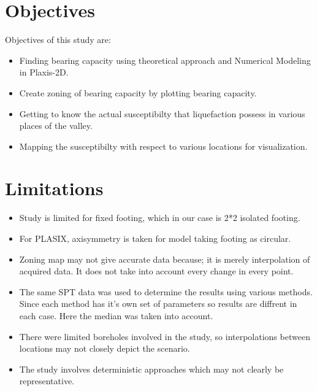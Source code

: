 \section{Objectives}
Objectives of this study are:
\begin{itemize}
  \item	Finding bearing capacity using theoretical approach and Numerical Modeling in Plaxis-2D.
  \item	Create zoning of bearing capacity by plotting bearing capacity.
  \item	Getting to know the actual susceptibilty that liquefaction possess in various places of the valley.
  \item	Mapping the susceptibilty with respect to various locations for visualization.  
\end{itemize}

\section{Limitations}
\begin{itemize}
  \item	Study is limited for fixed footing, which in our case is 2*2 isolated footing.
  \item For PLASIX, axisymmetry is taken for model taking footing as circular.
  \item	Zoning map may not give accurate data because; it is merely interpolation of acquired data. It does not take into account every change in every point.
  \item The same SPT data was used to determine the results using various methods. Since each method has it's own set of parameters so results are diffrent in each case. Here the median was taken into account.
  \item	There were limited boreholes involved in the study, so interpolations between locations may not closely depict the scenario.
  \item	The study involves deterministic approaches which may not clearly be representative.
\end{itemize}